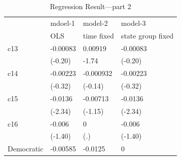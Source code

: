 \documentclass[man]{apa7}
\begin{document}
\begin{table}[htbp]
  \centering
  \caption{Regression Result---part 2}
  \begin{tabular}{llll}
    \toprule
                                                        & \multicolumn{1}{p{7.93em}}{mdoel-1} & \multicolumn{1}{p{7.855em}}{model-2}     & \multicolumn{1}{p{7.855em}}{model-3}           \\
                                                        & \multicolumn{1}{p{7.93em}}{OLS}     & \multicolumn{1}{p{7.855em}}{time fixed } & \multicolumn{1}{p{7.855em}}{state group fixed} \\
    \midrule
    \multicolumn{1}{p{8.355em}}{c13}                    & -0.00083                            & 0.00919                                  & -0.00083                                       \\
                                                        & \multicolumn{1}{p{7.93em}}{(-0.20)} & -1.74                                    & \multicolumn{1}{p{7.855em}}{(-0.20)}           \\
    \multicolumn{1}{p{8.355em}}{c14}                    & -0.00223                            & -0.000932                                & -0.00223                                       \\
                                                        & \multicolumn{1}{p{7.93em}}{(-0.32)} & \multicolumn{1}{p{7.855em}}{(-0.14)}     & \multicolumn{1}{p{7.855em}}{(-0.32)}           \\
    \multicolumn{1}{p{8.355em}}{c15}                    & -0.0136                             & -0.00713                                 & -0.0136                                        \\
                                                        & \multicolumn{1}{p{7.93em}}{(-2.34)} & \multicolumn{1}{p{7.855em}}{(-1.15)}     & \multicolumn{1}{p{7.855em}}{(-2.34)}           \\
    \multicolumn{1}{p{8.355em}}{c16}                    & -0.006                              & 0                                        & -0.006                                         \\
                                                        & \multicolumn{1}{p{7.93em}}{(-1.40)} & \multicolumn{1}{p{7.855em}}{(.)}         & \multicolumn{1}{p{7.855em}}{(-1.40)}           \\
    \multicolumn{1}{p{8.355em}}{Democratic}             & -0.00585                            & -0.0125                                  & 0                                              \\

\end{tabular}
\end{table}
\end{document}
